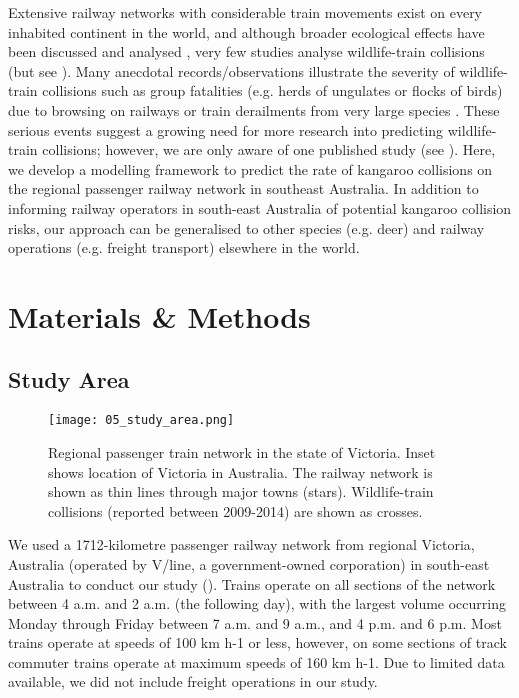 Extensive railway networks with considerable train movements exist on every inhabited continent in the world, and although broader ecological effects have been discussed \citep{desa93,givo06} and analysed \citep{wall05}, very few studies analyse wildlife-train collisions (but see \cite{bela95,onoy98}). Many anecdotal records/observations illustrate the severity of wildlife-train collisions such as group fatalities (e.g. herds of ungulates or flocks of birds) due to browsing on railways or train derailments from very large species \citep{dors15}. These serious events suggest a growing need for more research into predicting wildlife-train collisions; however, we are only aware of one published study (see \cite{gund98}). Here, we develop a modelling framework to predict the rate of kangaroo collisions on the regional passenger railway network in southeast Australia. In addition to informing railway operators in south-east Australia of potential kangaroo collision risks, our approach can be generalised to other species (e.g. deer) and railway operations (e.g. freight transport) elsewhere in the world.

\section{Materials \& Methods}

\subsection{Study Area}

\begin{figure*}[htp]
  \centering
  \texttt{[image: 05\_study\_area.png]}
  \caption[]{Regional passenger train network in the state of Victoria. Inset shows location of Victoria in Australia. The railway network is shown as thin lines through major towns (stars). Wildlife-train collisions (reported between 2009-2014) are shown as crosses.}
  \label{trains_study_area}
\end{figure*}

We used a 1712-kilometre passenger railway network from regional Victoria, Australia (operated by V/line, a government-owned corporation) in south-east Australia to conduct our study ().  Trains operate on all sections of the network between 4 a.m. and 2 a.m. (the following day), with the largest volume occurring Monday through Friday between 7 a.m. and 9 a.m., and 4 p.m. and 6 p.m. Most trains operate at speeds of 100 km h-1 or less, however, on some sections of track commuter trains operate at maximum speeds of 160 km h-1. Due to limited data available, we did not include freight operations in our study.

